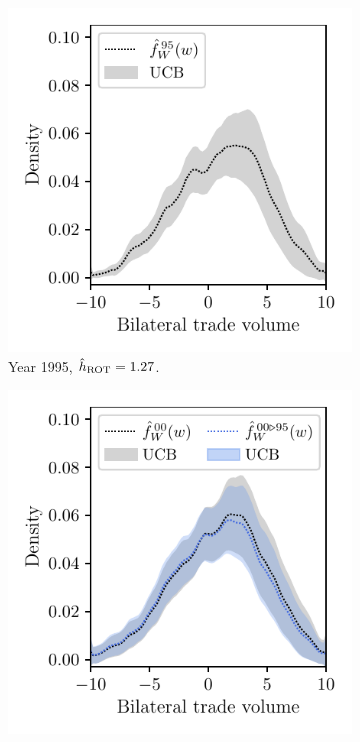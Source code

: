 \begin{figure}[b!]
  \centering
  \begin{subfigure}{0.32\textwidth}
    \centering
    \includegraphics[scale=0.64]{graphics/trade_plot_parametric_1995.pdf}
    \caption{Year 1995, $\hat h_{\operatorname{ROT}} = 1.27$.}
  \end{subfigure}
  \begin{subfigure}{0.32\textwidth}
    \centering
    \includegraphics[scale=0.64]{graphics/trade_plot_parametric_1995_2000.pdf}

\end{subfigure}
\end{figure}
